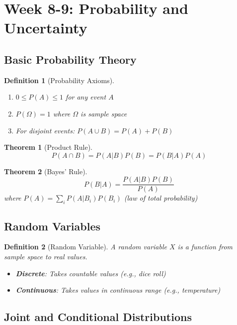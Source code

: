 \documentclass[11pt,letterpaper]{article}
\newtheorem{definition}{Definition}[section]
\newtheorem{theorem}{Theorem}[section]
\begin{document}
\section{Week 8-9: Probability and Uncertainty}

\subsection{Basic Probability Theory}

\begin{definition}[Probability Axioms]
\begin{enumerate}
    \item $0 \leq P(A) \leq 1$ for any event $A$
    \item $P(\Omega) = 1$ where $\Omega$ is sample space
    \item For disjoint events: $P(A \cup B) = P(A) + P(B)$
\end{enumerate}
\end{definition}

\begin{theorem}[Product Rule]
$$P(A \cap B) = P(A|B)P(B) = P(B|A)P(A)$$
\end{theorem}

\begin{theorem}[Bayes' Rule]
$$P(B|A) = \frac{P(A|B)P(B)}{P(A)}$$
where $P(A) = \sum_i P(A|B_i)P(B_i)$ (law of total probability)
\end{theorem}

\subsection{Random Variables}

\begin{definition}[Random Variable]
A random variable $X$ is a function from sample space to real values.
\begin{itemize}
    \item \textbf{Discrete}: Takes countable values (e.g., dice roll)
    \item \textbf{Continuous}: Takes values in continuous range (e.g., temperature)
\end{itemize}
\end{definition}

\subsection{Joint and Conditional Distributions}
\end{document}

